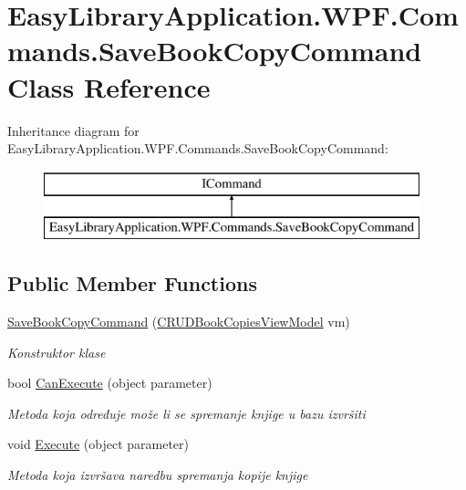 \hypertarget{class_easy_library_application_1_1_w_p_f_1_1_commands_1_1_save_book_copy_command}{}\section{Easy\+Library\+Application.\+W\+P\+F.\+Commands.\+Save\+Book\+Copy\+Command Class Reference}
\label{class_easy_library_application_1_1_w_p_f_1_1_commands_1_1_save_book_copy_command}
Inheritance diagram for Easy\+Library\+Application.\+W\+P\+F.\+Commands.\+Save\+Book\+Copy\+Command\+:\begin{figure}[H]
\begin{center}
\leavevmode
\includegraphics[height=2.000000cm]{class_easy_library_application_1_1_w_p_f_1_1_commands_1_1_save_book_copy_command}
\end{center}
\end{figure}
\subsection*{Public Member Functions}
\begin{DoxyCompactItemize}
\item 
\mbox{\hyperlink{class_easy_library_application_1_1_w_p_f_1_1_commands_1_1_save_book_copy_command_a01782390edf4df19e3238c8eec150350}{Save\+Book\+Copy\+Command}} (\mbox{\hyperlink{class_easy_library_application_1_1_w_p_f_1_1_view_model_1_1_c_r_u_d_book_copies_view_model}{C\+R\+U\+D\+Book\+Copies\+View\+Model}} vm)
\begin{DoxyCompactList}\small\item\em Konstruktor klase \end{DoxyCompactList}\item 
bool \mbox{\hyperlink{class_easy_library_application_1_1_w_p_f_1_1_commands_1_1_save_book_copy_command_a3a8957116f85a5e26f0a5f16932a9e3d}{Can\+Execute}} (object parameter)
\begin{DoxyCompactList}\small\item\em Metoda koja određuje može li se spremanje knjige u bazu izvršiti \end{DoxyCompactList}\item 
void \mbox{\hyperlink{class_easy_library_application_1_1_w_p_f_1_1_commands_1_1_save_book_copy_command_aba90ee05358c7e91ddce90c07c0aaf23}{Execute}} (object parameter)
\begin{DoxyCompactList}\small\item\em Metoda koja izvršava naredbu spremanja kopije knjige \end{DoxyCompactList}\end{DoxyCompactItemize}
